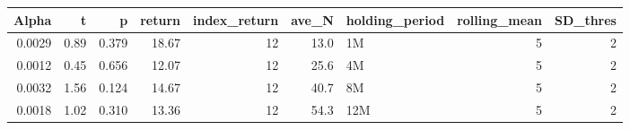 \begin{table}[ht]
\centering
\begin{tabular}{rrrrrrlrr}
  \hline
Alpha & t & p & return & index\_return & ave\_N & holding\_period & rolling\_mean & SD\_thres \\ 
  \hline
0.0029 & 0.89 & 0.379 & 18.67 & 12 & 13.0 & 1M &  5 &  2 \\ 
  0.0012 & 0.45 & 0.656 & 12.07 & 12 & 25.6 & 4M &  5 &  2 \\ 
  0.0032 & 1.56 & 0.124 & 14.67 & 12 & 40.7 & 8M &  5 &  2 \\ 
  0.0018 & 1.02 & 0.310 & 13.36 & 12 & 54.3 & 12M &  5 &  2 \\ 
   \hline
\end{tabular}
\end{table}

